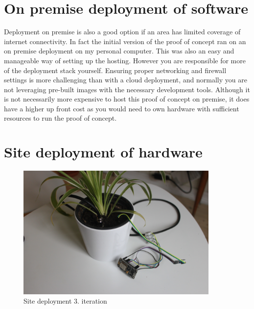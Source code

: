 \documentclass[]{uiophd}
\begin{document}
\section{On premise deployment of software}
Deployment on premise is also a good option if an area has limited coverage of internet connectivity. In fact the initial version of the proof of concept ran on an on premise deployment on my personal computer. This was also an easy and manageable way of setting up the hosting. However you are responsible for more of the deployment stack yourself. Ensuring proper networking and firewall settings is more challenging than with a cloud deployment, and normally you are not leveraging pre-built images with the necessary development tools. Although it is not necessarily more expensive to host this proof of concept on premise, it does have a higher up front cost as you would need to own hardware with sufficient resources to run the proof of concept.

\section{Site deployment of hardware}
 \begin{figure}[h]
\caption{Site deployment 3. iteration}
\centering
\includegraphics[width=10cm]{mcu+sensor.jpg}
\end{figure}
\end{document}
